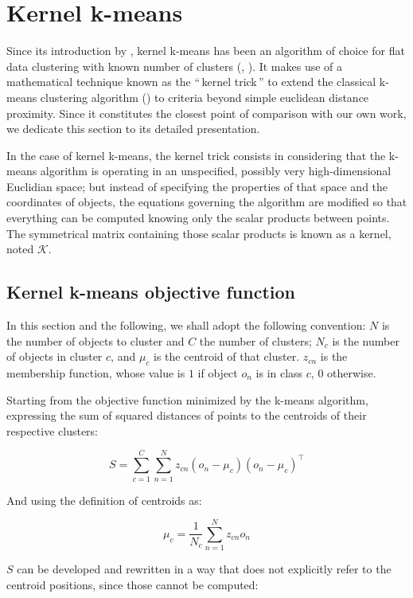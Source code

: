 \documentclass[10pt,journal,compsoc]{IEEEtran}
\newcommand{\gl}[1]{``\,#1\,''} %
\begin{document}
\section{Kernel k-means} \label{sec:kkmeans}

Since its introduction by \cite{Girolami:2002:MKC:2325785.2326903}, kernel k-means has been an algorithm of choice for flat data clustering with known number of clusters (\cite{Kulis2008}, \cite{Roth:2003:OCP:960254.960291}). It makes use of a mathematical technique known as the \gl{kernel trick} to extend the classical k-means clustering algorithm (\cite{macQueenBsmsp67}) to criteria beyond simple euclidean distance proximity. Since it constitutes the closest point of comparison with our own work, we dedicate this section to its detailed presentation.

In the case of kernel k-means, the kernel trick consists in considering that the k-means algorithm is operating in an unspecified, possibly very high-dimensional Euclidian space; but instead of specifying the properties of that space and the coordinates of objects, the equations governing the algorithm are modified so that everything can be computed knowing only the scalar products between points. The symmetrical matrix  containing those scalar products is known as a kernel, noted $\mathcal{K}$.

\subsection{Kernel k-means objective function}

In this section and the following, we shall adopt the following convention: $N$ is the number of objects to cluster and $C$ the number of clusters; $N_c$ is the number of objects in cluster $c$, and $\mu_c$ is the centroid of that cluster. $z_{cn}$ is the membership function, whose value is $1$ if object $o_n$ is in class $c$, $0$ otherwise.

Starting from the objective function minimized by the k-means algorithm, expressing the sum of squared distances of points to the centroids of their respective clusters:

\[
S = \sum_{c=1}^{C} \sum_{n=1}^{N} z_{cn} \left(o_n-\mu_c\right)\left(o_n-\mu_c\right)^\top \label{eq:S}
\]

And using the definition of centroids as:

\[
\mu_c = \frac{1}{N_c}\sum_{n=1}^{N}z_{cn}o_n
\]

$S$ can be developed and rewritten in a way that does not explicitly refer to the centroid positions, since those cannot be computed:
\end{document}
